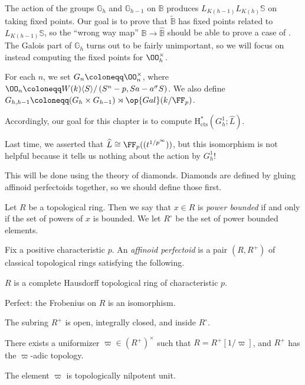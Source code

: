 \documentclass[../notes.tex]{subfiles}
\begin{document}
The action of the groups $\mathbb G_h$ and $\mathbb G_{h-1}$ on $\mathbb B$ produces $L_{K(h-1)}L_{K(h)}\mathbb S$ on taking fixed points. Our goal is to prove that $\widetilde{\mathbb B}$ has fixed points related to $L_{K(h-1)}\mathbb S$, so the ``wrong way map'' $\mathbb B\to\widehat{\mathbb B}$ should be able to prove a case of . The Galois part of $\mathbb G_h$ turns out to be fairly unimportant, so we will focus on instead computing the fixed points for $\OO_h^\times$.
\begin{notation}
	For each $n$, we set $G_n\coloneqq\OO_n^\times$, where $\OO_n\coloneqq W(k)\langle S\rangle/\left(S^n-p,Sa-a^\sigma S\right)$. We also define $G_{h,h-1}\coloneqq(G_h\times G_{h-1})\rtimes\op{Gal}(k/\FF_p)$.
\end{notation}
Accordingly, our goal for this chapter is to compute $\mathrm H^*_{\mathrm{cts}}(G_h^1;\widehat L)$.
\begin{remark}
	Last time, we asserted that $\widehat L\cong\FF_p((t^{1/p^\infty}))$, but this isomorphism is not helpful because it tells us nothing about the action by $G_h^1$!
\end{remark}
This will be done using the theory of diamonds. Diamonds are defined by gluing affinoid perfectoids together, so we should define those first.
\begin{definition}
	Let $R$ be a topological ring. Then we say that $x\in R$ is \textit{power bounded} if and only if the set of powers of $x$ is bounded. We let $R^\circ$ be the set of power bounded elements.
\end{definition}
\begin{definition}
	Fix a positive characteristic $p$. An \textit{affinoid perfectoid} is a pair $(R,R^+)$ of classical topological rings satisfying the following.
	\begin{listalph}
		\item $R$ is a complete Hausdorff topological ring of characteristic $p$.
		\item Perfect: the Frobenius on $R$ is an isomorphism.
		\item The subring $R^+$ is open, integrally closed, and inside $R^\circ$.
		\item There exists a uniformizer $\varpi\in (R^+)^\times$ such that $R=R^+[1/\varpi]$, and $R^+$ has the $\varpi$-adic topology.
		\item The element $\varpi$ is topologically nilpotent unit.
	\end{listalph}
\end{definition}
\end{document}
